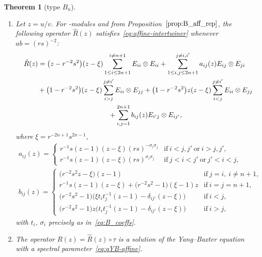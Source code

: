 \documentclass[pdftex]{sigma}
\numberwithin{equation}{section}
\newtheorem{Theorem}{Theorem}[section]
\newcommand{\sso}{\mathfrak{so}}
\begin{document}
\begin{Theorem}[type $B_{n}$]\label{thm:B_AffRMatrix}\quad
\begin{enumerate}
\item[$(a)$] Let $z=u/v$. For \smash{$U_{r,s}\bigl(\widehat{\sso}_{2n+1}\bigr)$}-modules  and  from Proposition~$\ref{prop:B_aff_rep}$, the following operator $\hat{R}(z)$ satisfies~\eqref{eq:affine-intertwiner} whenever $ab = (rs)^{-2}$:
\begin{gather}
 \hat{R}(z) = \bigl(z - r^{-2}s^{2}\bigr)(z - \xi) \sum_{1 \le i \le 2n + 1}^{i \neq n + 1} E_{ii} \otimes E_{ii} + \sum_{1 \le i,j \le 2n + 1}^{j \neq i,i'} a_{ij}(z) E_{ij} \otimes E_{ji} \nonumber\\
 \hphantom{\hat{R}(z) =}{}
 + \bigl(1 - r^{-2}s^{2}\bigr)(z - \xi) \sum_{i > j}^{j \neq i'} E_{ii} \otimes E_{jj} + \bigl(1 - r^{-2}s^{2}\bigr)z(z - \xi) \sum_{i < j}^{j \neq i'} E_{ii} \otimes E_{jj} \nonumber\\
 \hphantom{\hat{R}(z) =}{}
 + \sum_{i,j = 1}^{2n + 1} b_{ij}(z) E_{i'j} \otimes E_{ij'},\label{eq:B_AffRMatrix}
\end{gather}
where $\xi = r^{-2n +1}s^{2n - 1}$,
\begin{gather*}
 a_{ij}(z) =
 \begin{cases}
 r^{-1}s(z - 1)(z - \xi)(rs)^{-\sigma_{i}\sigma_{j}} &
 \text{if}\ i < j,j'\ \text{or}\ i > j,j', \\
 r^{-1}s(z - 1)(z - \xi)(rs)^{\sigma_{i}\sigma_{j}} &
 \text{if}\ j < i < j'\ \text{or}\ j' < i < j,
 \end{cases}
\\
 b_{ij}(z) =
 \begin{cases}
 \bigl(r^{-2}s^{2}z - \xi\bigr)(z - 1) & \text{if}\ j = i,\ i \neq n + 1 ,\\
 r^{-1}s(z - 1)(z - \xi) + \bigl(r^{-2}s^{2} - 1\bigr)(\xi - 1)z & \text{if}\ i = j = n+ 1 ,\\
 \bigl(r^{-2}s^{2} - 1\bigr)\bigl(\xi t_{i}t_{j}^{-1}(z - 1) - \delta_{ij'}(z - \xi)\bigr) & \text{if}\ i < j ,\\
 \bigl(r^{-2}s^{2} - 1\bigr)z\bigl(t_{i}t_{j}^{-1}(z - 1) - \delta_{ij'}(z - \xi)\bigr) & \text{if}\ i > j,
 \end{cases}
\end{gather*}
with $t_{i}$, $\sigma_{i}$ precisely as in~\eqref{eq:B_coeffs}.



\item[$(b)$] The operator $R(z)=\hat{R}(z)\circ \tau$ is a solution of the Yang--Baxter equation with a spectral parameter~\eqref{eq:qYB-affine}.
\end{enumerate}
\end{Theorem}
\end{document}
